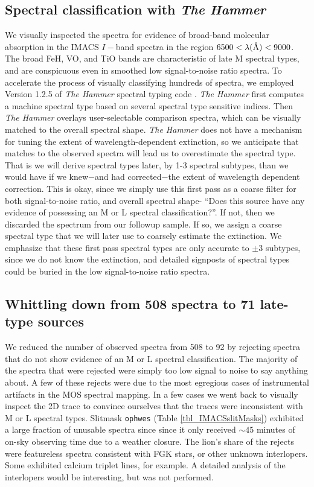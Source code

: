 \subsection{Spectral classification with \emph{The Hammer}}
We visually inspected the spectra for evidence of broad-band molecular absorption in the IMACS $I-$band spectra in the region $6500<\lambda(\mbox{\normalfont\AA})<9000 $.  The broad FeH, VO, and TiO bands are characteristic of late M spectral types, and are conspicuous even in smoothed low signal-to-noise ratio spectra.  To accelerate the process of visually classifying hundreds of spectra, we employed Version 1.2.5 of \emph{The Hammer} spectral typing code \citep{2007AJ....134.2398C,2011AJ....141...97W}.  \emph{The Hammer} first computes a machine spectral type based on several spectral type sensitive indices.  Then \emph{The Hammer} overlays user-selectable comparison spectra, which can be visually matched to the overall spectral shape.  \emph{The Hammer} does not have a mechanism for tuning the extent of wavelength-dependent extinction, so we anticipate that matches to the observed spectra will lead us to overestimate the spectral type.  That is we will derive spectral types later, by 1-3 spectral subtypes, than we would have if we knew$-$and had corrected$-$the extent of wavelength dependent correction.  This is okay, since we simply use this first pass as a coarse filter for both signal-to-noise ratio, and overall spectral shape- ``Does this source have any evidence of possessing an M or L spectral classification?''.  If not, then we discarded the spectrum from our followup sample.  If so, we assign a coarse spectral type that we will later use to coarsely estimate the extinction.  We emphasize that these first pass spectral types are only accurate to $\pm3$ subtypes, since we do not know the extinction, and detailed signposts of spectral types could be buried in the low signal-to-noise ratio spectra.

\subsection{ Whittling down from 508 spectra to 71 late-type sources}
We reduced the number of observed spectra from 508 to 92 by rejecting spectra that do not show evidence of an M or L spectral classification.  The majority of the spectra that were rejected were simply too low signal to noise to say anything about.  A few of these rejects were due to the most egregious cases of instrumental artifacts in the MOS spectral mapping.  In a few cases we went back to visually inspect the 2D trace to convince ourselves that the traces were inconsistent with M or L spectral types.    Slitmask \texttt{ophwes} (Table \ref{tbl_IMACSslitMasks}) exhibited a large fraction of unusable spectra since since it only received $\sim45$ minutes of on-sky observing time due to a weather closure.  The lion's share of the rejects were featureless spectra consistent with FGK stars, or other unknown interlopers.  Some exhibited calcium triplet lines, for example.  A detailed analysis of the interlopers would be interesting, but was not performed.

